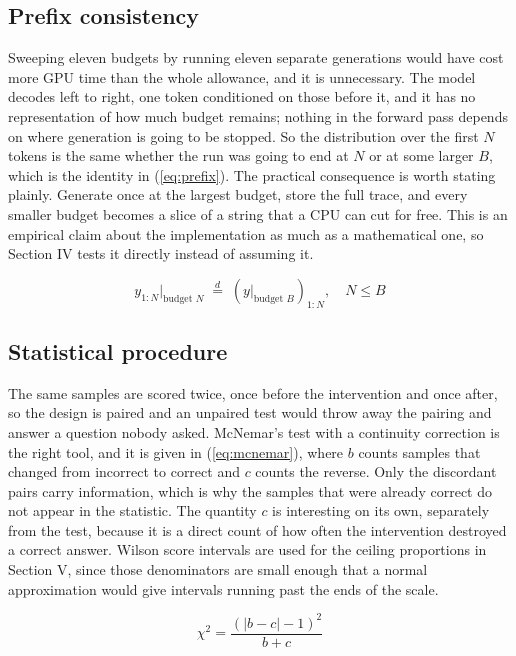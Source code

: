 \documentclass[conference]{IEEEtran}
\begin{document}
\subsection{Prefix consistency}

Sweeping eleven budgets by running eleven separate generations would have cost
more GPU time than the whole allowance, and it is unnecessary. The model decodes
left to right, one token conditioned on those before it, and it has no
representation of how much budget remains; nothing in the forward pass depends on
where generation is going to be stopped. So the distribution over the first $N$
tokens is the same whether the run was going to end at $N$ or at some larger $B$,
which is the identity in (\ref{eq:prefix}). The practical consequence
is worth stating plainly. Generate once at the largest budget, store the full
trace, and every smaller budget becomes a slice of a string that a CPU can cut for
free. This is an empirical claim about the implementation as much as a
mathematical one, so Section IV tests it directly instead of assuming it.

\begin{equation}
y_{1:N} \Big|_{\text{budget } N}
\;\overset{d}{=}\;
\left(y \Big|_{\text{budget } B}\right)_{1:N},
\quad N \le B
\label{eq:prefix}
\end{equation}

\subsection{Statistical procedure}

The same samples are scored twice, once before the intervention and once after,
so the design is paired and an unpaired test would throw away the pairing and
answer a question nobody asked. McNemar's test with a continuity correction
\cite{mcnemar} is the right tool, and it is given in (\ref{eq:mcnemar}), where $b$
counts samples that changed from incorrect to correct and $c$ counts the reverse.
Only the discordant pairs carry information, which is why the samples that were
already correct do not appear in the statistic. The quantity $c$ is interesting on
its own, separately from the test, because it is a direct count of how often the
intervention destroyed a correct answer. Wilson score intervals \cite{wilson} are
used for the ceiling proportions in Section V, since those denominators are small
enough that a normal approximation would give intervals running past the ends of
the scale.

\begin{equation}
\chi^{2} = \frac{\left(|b - c| - 1\right)^{2}}{b + c}
\label{eq:mcnemar}
\end{equation}
\end{document}
